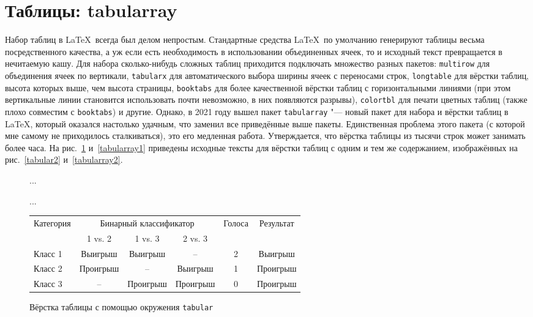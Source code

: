 \documentclass[a4paper,12pt,hyphens]{article}
\newcommand\package[1]{\texttt{#1}}
\begin{document}
\section{Таблицы: tabularray}
Набор таблиц в \LaTeX\ всегда был делом непростым. Стандартные средства \LaTeX\ по умолчанию генерируют таблицы весьма посредственного качества, а уж если есть необходимость в использовании объединенных ячеек, то и исходный текст превращается в нечитаемую кашу. Для набора сколько-нибудь сложных таблиц приходится подключать множество разных пакетов: \package{multirow} \parencite{ctan-multirow} для объединения ячеек по вертикали, \package{tabularx} \parencite{ctan-tabularx} для автоматического выбора ширины ячеек с переносами строк, \package{longtable} \parencite{ctan-longtable} для вёрстки таблиц, высота которых выше, чем высота страницы, \package{booktabs} \parencite{ctan-booktabs} для более качественной вёрстки таблиц с горизонтальными линиями (при этом вертикальные линии становится использовать почти невозможно, в них появляются разрывы), \package{colortbl} \parencite{ctan-colortbl} для печати цветных таблиц (также плохо совместим с \package{booktabs}) и другие. Однако, в 2021 году вышел пакет \package{tabularray} \parencite{ctan-tabularray} "--- новый пакет для набора и вёрстки таблиц в \LaTeX, который оказался настолько удачным, что заменил все приведённые выше пакеты. Единственная проблема этого пакета (с которой мне самому не приходилось сталкиваться), это его медленная работа. Утверждается, что вёрстка таблицы из тысячи строк может занимать более часа. На рис.~\ref{tabular1} и~\ref{tabularray1} приведены исходные тексты для вёрстки таблиц с одним и тем же содержанием, изображённых на рис.~\ref{tabular2} и~\ref{tabularray2}.%
\begin{figure}[tp]
\begin{latexcode}
...
\usepackage{booktabs}
\usepackage{multirow}
...
\begin{tabular}{lccccc}
\toprule
\multirow{2}{*}[-0.5ex]{Категория} & \multicolumn{3}{c}{Бинарный классификатор} &
\multirow{2}{*}[-0.5ex]{Голоса} & \multirow{2}{*}[-0.5ex]{Результат} \\
\cmidrule(lr){2-4}
        & 1 vs. 2  & 1 vs. 3  & 2 vs. 3  \\
\midrule
Класс 1 & Выигрыш  & Выигрыш  & --       & 2 & Выигрыш \\ 
Класс 2 & Проигрыш & --       & Выигрыш  & 1 & Проигрыш \\ 
Класс 3 & --       & Проигрыш & Проигрыш & 0 & Проигрыш \\ 
\bottomrule
\end{tabular}
\end{latexcode}
\caption{Вёрстка таблицы с помощью окружения \package{tabular}}\label{tabular1}
\end{figure}%
\end{document}
